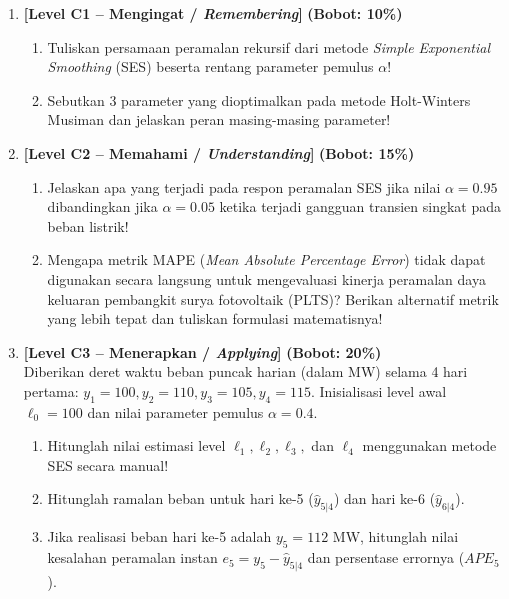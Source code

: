 \documentclass[11pt,a4paper]{article}
\begin{document}
\begin{enumerate}[leftmargin=1.5em, label=\textbf{Soal \arabic*.}]

    \item \textbf{[Level C1 -- Mengingat / \textit{Remembering}]} \hfill \textbf{(Bobot: 10\%)}
    \begin{enumerate}[label=\alph*.]
        \item Tuliskan persamaan peramalan rekursif dari metode \textit{Simple Exponential Smoothing} (SES) beserta rentang parameter pemulus $\alpha$!
        \item Sebutkan 3 parameter yang dioptimalkan pada metode Holt-Winters Musiman dan jelaskan peran masing-masing parameter!
    \end{enumerate}

    \vspace{0.3cm}

    \item \textbf{[Level C2 -- Memahami / \textit{Understanding}]} \hfill \textbf{(Bobot: 15\%)}
    \begin{enumerate}[label=\alph*.]
        \item Jelaskan apa yang terjadi pada respon peramalan SES jika nilai $\alpha = 0.95$ dibandingkan jika $\alpha = 0.05$ ketika terjadi gangguan transien singkat pada beban listrik!
        \item Mengapa metrik MAPE (\textit{Mean Absolute Percentage Error}) tidak dapat digunakan secara langsung untuk mengevaluasi kinerja peramalan daya keluaran pembangkit surya fotovoltaik (PLTS)? Berikan alternatif metrik yang lebih tepat dan tuliskan formulasi matematisnya!
    \end{enumerate}

    \vspace{0.3cm}

    \item \textbf{[Level C3 -- Menerapkan / \textit{Applying}]} \hfill \textbf{(Bobot: 20\%)} \\
    Diberikan deret waktu beban puncak harian (dalam MW) selama 4 hari pertama:
    $y_1 = 100, y_2 = 110, y_3 = 105, y_4 = 115$.
    Inisialisasi level awal $\ell_0 = 100$ dan nilai parameter pemulus $\alpha = 0.4$.
    \begin{enumerate}[label=\alph*.]
        \item Hitunglah nilai estimasi level $\ell_1, \ell_2, \ell_3,$ dan $\ell_4$ menggunakan metode SES secara manual!
        \item Hitunglah ramalan beban untuk hari ke-5 ($\hat{y}_{5|4}$) dan hari ke-6 ($\hat{y}_{6|4}$).
        \item Jika realisasi beban hari ke-5 adalah $y_5 = 112$ MW, hitunglah nilai kesalahan peramalan instan $e_5 = y_5 - \hat{y}_{5|4}$ dan persentase errornya ($APE_5$).
    \end{enumerate}


\end{enumerate}
\end{document}
